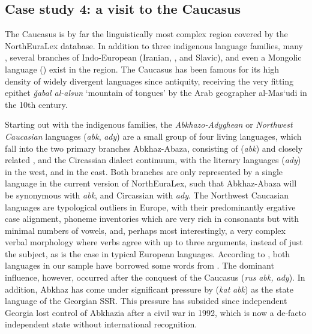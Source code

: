 \subsection{Case study 4: a visit to the Caucasus}
The Caucasus is by far the linguistically most complex region covered by the NorthEuraLex database. In addition to three indigenous language families, many , several branches of Indo-European (Iranian, , and Slavic), and even a Mongolic language () exist in the region. The Caucasus has been famous for its high density of widely divergent languages since antiquity, receiving the very fitting epithet \textit{\v{g}abal al-alsun} `mountain of tongues' by the Arab geographer al-Mas\textquoteleft udi in the 10th century.

Starting out with the indigenous families, the \textit{Abkhazo-Adyghean} or \textit{Northwest Caucasian} languages (\textit{abk}, \textit{ady}) are a small group of four living languages, which fall into the two primary branches Abkhaz-Abaza, consisting of  (\textit{abk}) and closely related , and the Circassian dialect continuum, with the literary languages  (\textit{ady}) in the west, and  in the east. Both branches are only represented by a single language in the current version of NorthEuraLex, such that Abkhaz-Abaza will be synonymous with \textit{abk}, and Circassian with \textit{ady}. The Northwest Caucasian languages are typological outliers in Europe, with their predominantly ergative case alignment, phoneme inventories which are very rich in consonants but with minimal numbers of vowels, and, perhaps most interestingly, a very complex verbal morphology where
verbs agree with up to three arguments, instead of just the subject, as is the case in typical European languages. According to \cite{hewitt2004}, both languages in our sample have borrowed some words from . The dominant influence, however, occurred after the  conquest of the Caucasus (\textit{rus} \arrowLA \textit{abk, ady}). In addition, Abkhaz has come under significant pressure by  (\textit{kat} \arrowLA \textit{abk}) as the state language of the Georgian SSR. This pressure has subsided since independent Georgia lost control of Abkhazia after a civil war in 1992, which is now a de-facto independent state without international recognition.

